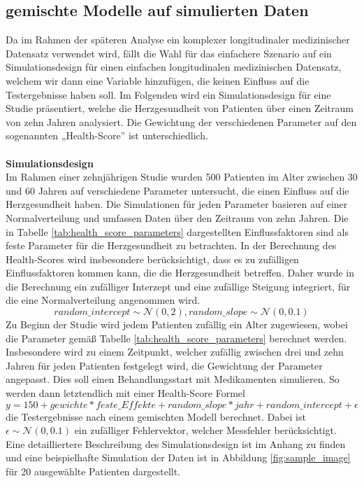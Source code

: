\documentclass[%
thesis=student,%
coverpage=false,%
titlepage=false,%
headmarks=true, %
german,%
font=libertine, %
math=newpxtx, %
BCOR=5mm,%
coverBCOR=11mm%
]{tumbook}
\theoremstyle{break}
\begin{document}
\subsection{gemischte Modelle auf simulierten Daten}
Da im Rahmen der späteren Analyse ein komplexer longitudinaler medizinischer Datensatz verwendet wird, fällt die Wahl für das einfachere Szenario auf ein Simulationsdesign für einen einfachen longitudinalen medizinischen Datensatz, welchem wir dann eine Variable hinzufügen, die keinen Einfluss auf die Testergebnisse haben soll. Im Folgenden wird ein Simulationsdesign für eine Studie präsentiert, welche die Herzgesundheit von Patienten über einen Zeitraum von zehn Jahren analysiert. Die Gewichtung der verschiedenen Parameter auf den sogenannten „Health-Score” ist unterschiedlich.\\
\\
\textbf{Simulationsdesign}\\
Im Rahmen einer zehnjährigen Studie wurden 500 Patienten im Alter zwischen 30 und 60 Jahren auf verschiedene Parameter untersucht, die einen Einfluss auf die Herzgesundheit haben. Die Simulationen für jeden Parameter basieren auf einer Normalverteilung und umfassen Daten über den Zeitraum von zehn Jahren. Die in Tabelle \ref{tab:health_score_parameters} dargestellten Einflussfaktoren sind als feste Parameter für die Herzgesundheit zu betrachten. In der Berechnung des Health-Scores wird insbesondere berücksichtigt, dass es zu zufälligen Einflussfaktoren kommen kann, die die Herzgesundheit betreffen. Daher wurde in die Berechnung ein zufälliger Interzept und eine zufällige Steigung integriert, für die eine Normalverteilung angenommen wird. $$random\_intercept \sim \mathcal{N}(0,2), random\_slope \sim \mathcal{N}(0,0.1)$$  
Zu Beginn der Studie wird jedem Patienten zufällig ein Alter zugewiesen, wobei die Parameter gemäß Tabelle \ref{tab:health_score_parameters} berechnet werden. Insbesondere wird zu einem Zeitpunkt, welcher zufällig zwischen drei und zehn Jahren für jeden Patienten festgelegt wird, die Gewichtung der Parameter angepasst. Dies soll einen Behandlungsstart mit Medikamenten simulieren. So werden dann letztendlich mit einer Health-Score Formel $$ y = 150 +  gewichte * feste\_Effekte + random\_slope * jahr + random\_intercept + \epsilon $$ die Testergebnisse nach einem gemischten Modell berechnet. Dabei ist $\epsilon \sim \mathcal{N}(0,0.1)$ ein zufälliger Fehlervektor, welcher Messfehler berücksichtigt. Eine detailliertere Beschreibung des Simulationsdesign ist im Anhang zu finden und eine beispielhafte Simulation der Daten ist in Abbildung \ref{fig:sample_image} für 20 ausgewählte Patienten dargestellt. \\
\end{document}

